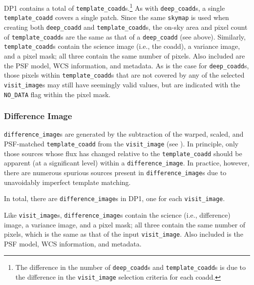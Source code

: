 \gls{DP1} contains a total of \ntemplatecoadds \texttt{template\_coadd}s.\footnote{The difference in the number of \texttt{deep\_coadd}s and \texttt{template\_coadd}s is due to the difference in the \texttt{visit\_image} selection criteria for each coadd.}
As with \texttt{deep\_coadd}s, a single \texttt{template\_coadd} covers a single \gls{patch}.
Since the same \texttt{skymap} is used when creating both \texttt{deep\_coadd} and \texttt{template\_coadd}s, the on-sky area and pixel count of \texttt{template\_coadd}s are the same as that of a \texttt{deep\_coadd} (see above).
Similarly, \texttt{template\_coadd}s contain the science image (i.e., the coadd), a variance image, and a pixel mask; all three contain the same number of pixels.
Also included are the \gls{PSF} model, \gls{WCS} information, and \gls{metadata}.
As is the case for \texttt{deep\_coadd}s, those pixels within \texttt{template\_coadd}s that are not covered by any of the selected \texttt{visit\_image}s may still have seemingly valid values, but are indicated with the \texttt{NO\_DATA} flag within the pixel mask.

\subsubsection{Difference Image}
\texttt{difference\_image}s \citep{10.71929/rubin/2570312} are generated by the subtraction of the warped, scaled, and \gls{PSF}-matched \texttt{template\_coadd} from the \texttt{visit\_image} (see ). In principle, only those sources whose \gls{flux} has changed relative to the \texttt{template\_coadd} should be apparent (at a significant level) within a \texttt{difference\_image}. In practice, however, there are numerous spurious sources present in \texttt{difference\_image}s due to unavoidably imperfect template matching.

In total, there are \ndifferenceimages \texttt{difference\_image}s in \gls{DP1}, one for each \texttt{visit\_image}.

Like \texttt{visit\_image}s, \texttt{difference\_image}s contain the science (i.e., difference) image, a variance image, and a pixel mask; all three contain the same number of pixels, which is the same as that of the input \texttt{visit\_image}.
Also included is the \gls{PSF} model, \gls{WCS} information, and \gls{metadata}.


